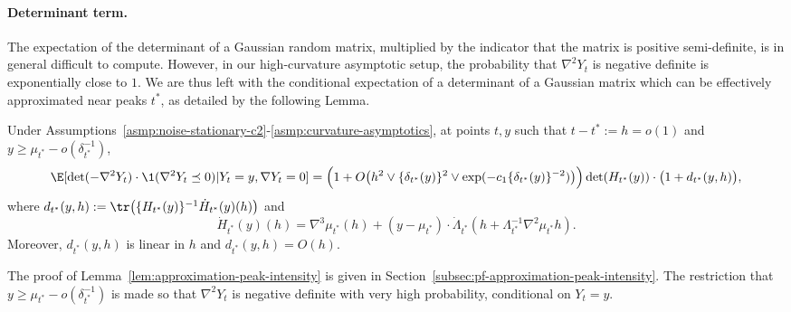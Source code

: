 \documentclass{article}
\begin{document}
	\paragraph{Determinant term.}
	The expectation of the determinant of a Gaussian random matrix, multiplied by the indicator that the matrix is positive semi-definite, is in general difficult to compute. However, in our high-curvature asymptotic setup, the probability that $\nabla^2 Y_t$ is negative definite is exponentially close to $1$. We are thus left with the conditional expectation of a determinant of a Gaussian matrix which can be effectively approximated near peaks $t^*$, as detailed by the following Lemma.
	\begin{lemma}
		\label{lem:approximation-peak-intensity}
		Under Assumptions~\ref{asmp:noise-stationary-c2}-\ref{asmp:curvature-asymptotics}, at points $t,y$ such that $t - t^* := h = o(1)$ and $y \geq \mu_{t^*} - o(\delta_{t^*}^{-1})$,
		\begin{equation}
			\label{eqn:approximate-intensity-1}
			\E[\det(-\nabla^2 Y_t) \cdot \1(\nabla^2 Y_t \preceq 0)|Y_t = y,\nabla Y_t = 0] =  \Big(1 + O\big(h^2 \vee \{\delta_{t^*}(y)\}^2 \vee \exp(-c_1 \{\delta_{t^*}(y)\}^{-2})\big)\Big)\det(H_{t^*}(y))\cdot\big(1 + d_{t^*}(y,h)\big),
		\end{equation}
		where $d_{t^*}(y,h) := \tr\big(\{H_{t^*}(y)\}^{-1} \dot{H}_{t^*}(y)(h)\big)$ and
		\begin{equation}
			\label{eqn:hessian-deterministic-equivalent-derivative}
			\dot{H}_{t^*}(y)(h) = \nabla^3 \mu_{t^*}(h) + (y - \mu_{t^*})\cdot \dot{\Lambda}_{t^*}(h + \Lambda_{t^*}^{-1} \nabla^2 \mu_{t^*}h).
		\end{equation}
		Moreover, $d_{t^*}(y,h)$ is linear in $h$ and $d_{t^*}(y,h) = O(h)$.
	\end{lemma}
	The proof of Lemma~\ref{lem:approximation-peak-intensity} is given in Section~\ref{subsec:pf-approximation-peak-intensity}. The restriction that $y \geq \mu_{t^*} - o(\delta_{t^*}^{-1})$ is made so that $\nabla^2 Y_t$ is negative definite with very high probability,  conditional on $Y_t = y$.
	
\end{document}

